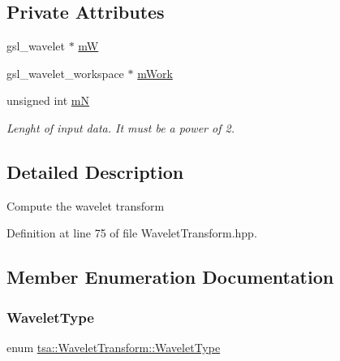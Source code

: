 \subsection*{Private Attributes}
\begin{DoxyCompactItemize}
\item 
gsl\+\_\+wavelet $\ast$ \hyperlink{classtsa_1_1_wavelet_transform_a5ee4ab685e354aafa0a1f617f0b624b4}{mW}
\item 
gsl\+\_\+wavelet\+\_\+workspace $\ast$ \hyperlink{classtsa_1_1_wavelet_transform_a0629db488589d2b7451746747456cee2}{m\+Work}
\item 
unsigned int \hyperlink{classtsa_1_1_wavelet_transform_a8497adc5f0a85650a880992b3765f75a}{mN}
\begin{DoxyCompactList}\small\item\em Lenght of input data. It must be a power of 2. \end{DoxyCompactList}\end{DoxyCompactItemize}


\subsection{Detailed Description}
Compute the wavelet transform 

Definition at line 75 of file Wavelet\+Transform.\+hpp.



\subsection{Member Enumeration Documentation}
\mbox{\label{classtsa_1_1_wavelet_transform_a5a529de70e0004333fcf23b9cca88ce7}} 
\subsubsection{\texorpdfstring{Wavelet\+Type}{WaveletType}}
{\footnotesize\ttfamily enum \hyperlink{classtsa_1_1_wavelet_transform_a5a529de70e0004333fcf23b9cca88ce7}{tsa\+::\+Wavelet\+Transform\+::\+Wavelet\+Type}}

